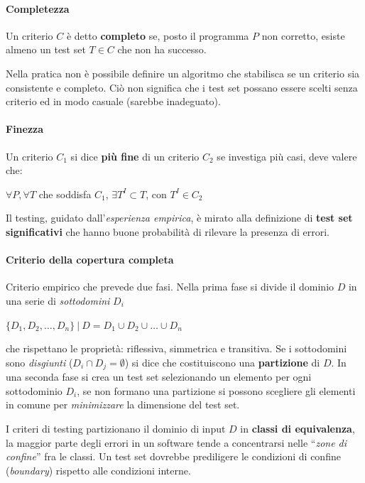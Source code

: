 \paragraph{Completezza} Un criterio $C$ è detto \textbf{completo} se, posto il programma $P$ non corretto, esiste almeno un test set $T \in C$ che non ha successo.

Nella pratica non è possibile definire un algoritmo che stabilisca se un criterio sia consistente e completo. Ciò non significa che i test set possano essere scelti senza criterio ed in modo casuale (sarebbe inadeguato).

\paragraph{Finezza} Un criterio $C_1$ si dice \textbf{più fine} di un criterio $C_2$ se investiga più casi, deve valere che:
\begin{center}
    $\forall P, \forall T$ che soddisfa $C_1$, $\exists T^I \subset T$, con $T^I \in C_2$
\end{center}
Il testing, guidato dall'\textit{esperienza empirica}, è mirato alla definizione di \textbf{test set significativi} che hanno buone probabilità di rilevare la presenza di errori.

\paragraph{Criterio della copertura completa} Criterio empirico che prevede due fasi. Nella prima fase si divide il dominio $D$ in una serie di \textit{sottodomini} $D_i$
\begin{center}
    $\{D_1, D_2, \ldots, D_n\}\ |\ D = D_1 \cup D_2 \cup \ldots \cup D_n$
\end{center}
che rispettano le proprietà: riflessiva, simmetrica e transitiva.
Se i sottodomini sono \textit{disgiunti} ($D_i \cap D_j = \emptyset$) si dice che costituiscono una \textbf{partizione} di $D$. In una seconda fase si crea un test set selezionando un elemento per ogni sottodominio $D_i$, se non formano una partizione si possono scegliere gli elementi in comune per \textit{minimizzare} la dimensione del test set.

I criteri di testing partizionano il dominio di input $D$ in \textbf{classi di equivalenza}, la maggior parte degli errori in un software tende a concentrarsi nelle “\textit{zone di confine}” fra le classi. Un test set dovrebbe prediligere le condizioni di confine (\textit{boundary}) rispetto alle condizioni interne.

